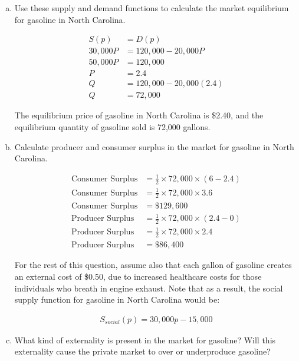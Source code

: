 \documentclass{article}
\begin{document}
\begin{enumerate}[(a)]
    \item Use these supply and demand functions to calculate the market equilibrium for gasoline in North Carolina.
    
    \begin{align*}
        S(p) &= D(p)\\
        30,000P &= 120,000 - 20,000P\\
        50,000P &= 120,000\\
        P &= 2.4\\
        Q &= 120,000 - 20,000(2.4)\\
        Q &= 72,000
    \end{align*}

    The equilibrium price of gasoline in North Carolina is \$2.40, and the equilibrium quantity of gasoline sold is 72,000 gallons.
    
    \item Calculate producer and consumer surplus in the market for gasoline in North Carolina.

    \begin{align*}
        \text{Consumer Surplus} &= \frac{1}{2} \times 72,000 \times (6 - 2.4)\\
        \text{Consumer Surplus} &= \frac{1}{2} \times 72,000 \times 3.6\\
        \text{Consumer Surplus} &= \$129,600\\
        \text{Producer Surplus} &= \frac{1}{2} \times 72,000 \times (2.4 - 0)\\
        \text{Producer Surplus} &= \frac{1}{2} \times 72,000 \times 2.4\\
        \text{Producer Surplus} &= \$86,400
    \end{align*}

    For the rest of this question, assume also that each gallon of gasoline creates an external cost of \$0.50, due to increased healthcare costs for those individuals who breath in engine exhaust. Note that as a result, the social supply function for gasoline in North Carolina would be:

    \begin{align*}
        S_{social}(p) = 30,000p - 15,000
    \end{align*}

    \item What kind of externality is present in the market for gasoline? Will this externality cause the private market to over or underproduce gasoline?
    

\end{enumerate}
\end{document}
